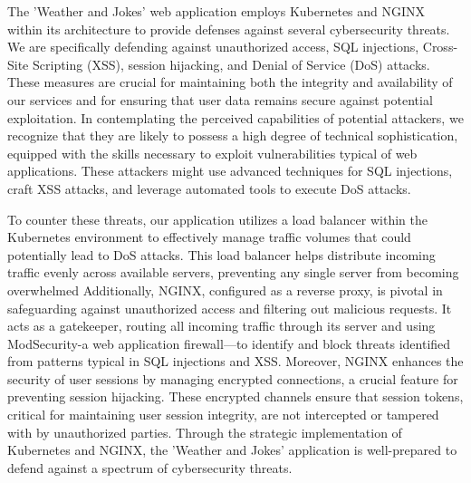 The 'Weather and Jokes' web application employs Kubernetes and NGINX within its architecture to provide defenses against several cybersecurity threats. 
We are specifically defending against unauthorized access, SQL injections, Cross-Site Scripting (XSS), session hijacking, and Denial of Service (DoS) attacks. 
These measures are crucial for maintaining both the integrity and availability of our services and for ensuring that user data remains secure against potential exploitation.
In contemplating the perceived capabilities of potential attackers, we recognize that they are likely to possess a high degree of technical sophistication, equipped with the skills necessary to exploit vulnerabilities typical of web applications. 
These attackers might use advanced techniques for SQL injections, craft XSS attacks, and leverage automated tools to execute DoS attacks.

To counter these threats, our application utilizes a load balancer within the Kubernetes environment to effectively manage traffic volumes that could potentially lead to DoS attacks. 
This load balancer helps distribute incoming traffic evenly across available servers, preventing any single server from becoming overwhelmed
Additionally, NGINX, configured as a reverse proxy, is pivotal in safeguarding against unauthorized access and filtering out malicious requests. It acts as a gatekeeper, routing all incoming traffic through its server and using ModSecurity-a web application firewall—to identify and block threats identified from patterns typical in SQL injections and XSS. 
Moreover, NGINX enhances the security of user sessions by managing encrypted connections, a crucial feature for preventing session hijacking. 
These encrypted channels ensure that session tokens, critical for maintaining user session integrity, are not intercepted or tampered with by unauthorized parties.
Through the strategic implementation of Kubernetes and NGINX, the 'Weather and Jokes' application is well-prepared to defend against a spectrum of cybersecurity threats.
